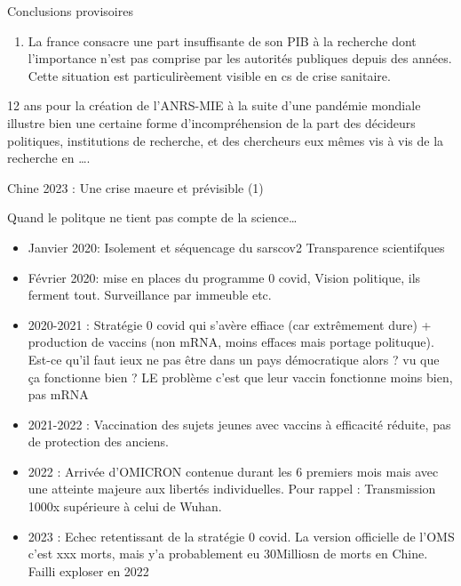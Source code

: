 \documentclass[
  ignorenonframetext,
]{beamer}
\providecommand{\tightlist}{%
  \setlength{\itemsep}{0pt}\setlength{\parskip}{0pt}}\usepackage{longtable,booktabs,array}
\begin{document}
\begin{frame}{Conclusions provisoires}
\protect\hypertarget{conclusions-provisoires-1}{}
\begin{enumerate}
\tightlist
\item
  La france consacre une part insuffisante de son PIB à la recherche
  dont l'importance n'est pas comprise par les autorités publiques
  depuis des années. Cette situation est particulirèement visible en cs
  de crise sanitaire.
\end{enumerate}

12 ans pour la création de l'ANRS-MIE à la suite d'une pandémie mondiale
illustre bien une certaine forme d'incompréhension de la part des
décideurs politiques, institutions de recherche, et des chercheurs eux
mêmes vis à vis de la recherche en \ldots.
\end{frame}

\begin{frame}{Chine 2023 : Une crise maeure et prévisible (1)}
\protect\hypertarget{chine-2023-une-crise-maeure-et-pruxe9visible-1}{}
\begin{block}{Quand le politque ne tient pas compte de la
science\ldots{}}
\protect\hypertarget{quand-le-politque-ne-tient-pas-compte-de-la-science}{}
\begin{itemize}
\item
  Janvier 2020: Isolement et séquencage du sarscov2 Transparence
  scientifques
\item
  Février 2020: mise en places du programme 0 covid, Vision politique,
  ils ferment tout. Surveillance par immeuble etc.
\item
  2020-2021 : Stratégie 0 covid qui s'avère effiace (car extrêmement
  dure) + production de vaccins (non mRNA, moins effaces mais portage
  polituque). Est-ce qu'il faut ieux ne pas être dans un pays
  démocratique alors ? vu que ça fonctionne bien ? LE problème c'est que
  leur vaccin fonctionne moins bien, pas mRNA
\item
  2021-2022 : Vaccination des sujets jeunes avec vaccins à efficacité
  réduite, pas de protection des anciens.
\item
  2022 : Arrivée d'OMICRON contenue durant les 6 premiers mois mais avec
  une atteinte majeure aux libertés individuelles. Pour rappel :
  Transmission 1000x supérieure à celui de Wuhan.
\item
  2023 : Echec retentissant de la stratégie 0 covid. La version
  officielle de l'OMS c'est xxx morts, mais y'a probablement eu
  30Milliosn de morts en Chine. Failli exploser en 2022
\end{itemize}
\end{block}
\end{frame}
\end{document}
